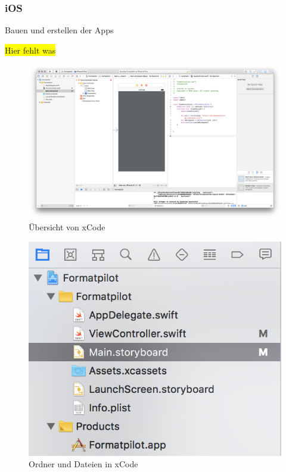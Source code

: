 \subsubsection{iOS}
Bauen und erstellen der Apps

\colorbox{yellow}{Hier fehlt was}

\begin{figure}[h]
    \centering
    \includegraphics[width=\textwidth]{images/kapitel_4/ios_ide.png}
    \caption{Übersicht von xCode}
    \label{fig:umsetzung_ios_ide}
\end{figure}

\begin{figure}[h]
    \centering
    \includegraphics[scale=0.7]{images/kapitel_4/ios_folder.png}
    \caption{Ordner und Dateien in xCode}
    \label{fig:umsetzung_ios_folder}
\end{figure}

